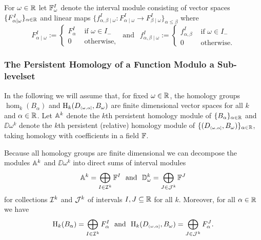 For $\omega\in\R$ let $\FF_\omega^I$ denote the interval module consisting of vector spaces $\{F_{\alpha\mid\omega}^I\}_{\alpha\in\R}$ and linear maps $\{f_{\alpha,\beta\mid \omega}^I : F_{\alpha\mid\omega}^I\to F_{\beta\mid\omega}^I\}_{\alpha\leq\beta}$ where
\[ F_{\alpha\mid \omega}^I := \begin{cases} F_\alpha^I&\text{ if } \omega\in I_-\\ 0&\text{ otherwise,}\end{cases}\ \text{ and }\ \ f_{\alpha,\beta\mid\omega}^I := \begin{cases} f_{\alpha,\beta}^I&\text{ if } \omega\in I_-\\ 0&\text{ otherwise.}\end{cases}\]

\subsubsection{The Persistent Homology of a Function Modulo a Sub-levelset}

In the following we will assume that, for fixed $\omega\in\R$, the homology groups $\hom_k(B_\alpha)$ and $\hom_k(D\subi{\omega,\alpha}, B_\omega)$ are finite dimensional vector spaces for all $k$ and $\alpha\in\R$.
Let $\AA^k$ denote the $k$th persistent homology module of $\{B_\alpha\}_{\alpha\in\R}$ and $\DD{\omega}^k$ denote the $k$th persistent (relative) homology module of $\{(D\subi{\omega,\alpha},B_\omega)\}_{\alpha\in\R}$, taking homology with coefficients in a field $\FF$.

Because all homology groups are finite dimensional we can decompose the modules $\AA^k$ and $\DD{\omega}^k$ into direct sums of interval modules
\[ \AA^k = \bigoplus_{I\in\I^k} \FF^I\ \text{ and }\ \DD{\omega}^k = \bigoplus_{J\in\J^k} \FF^J\]
for collections $\I^k$ and $\J^k$ of intervals $I,J\subseteq \R$ for all $k$.
Moreover, for all $\alpha\in\R$ we have
\[ \hom_k(B_\alpha) = \bigoplus_{I\in \I^k}F_\alpha^I\ \text{ and }\ \hom_k(D\subi{\omega,\alpha}, B_\omega) = \bigoplus_{J\in\J^k} F_\alpha^J.\]

